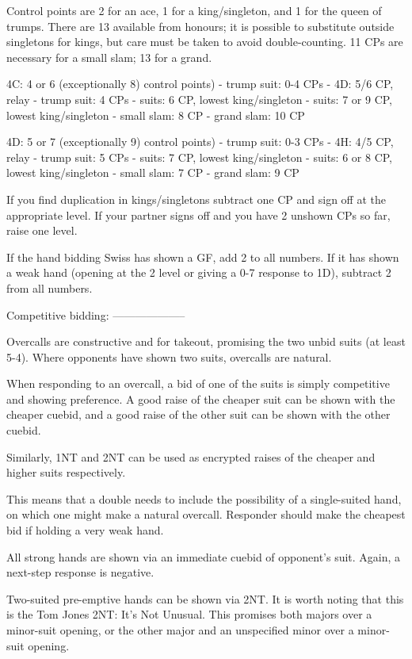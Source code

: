 Control points are 2 for an ace, 1 for a king/singleton, and 1 for the queen of
trumps.  There are 13 available from honours; it is possible to substitute
outside singletons for kings, but care must be taken to avoid double-counting.
11 CPs are necessary for a small slam; 13 for a grand.

4C: 4 or 6 (exceptionally 8) control points)
   - trump suit: 0-4 CPs
   - 4D: 5/6 CP, relay
      - trump suit: 4 CPs
      - suits: 6 CP, lowest king/singleton
   - suits: 7 or 9 CP, lowest king/singleton
   - small slam: 8 CP
   - grand slam: 10 CP

4D: 5 or 7 (exceptionally 9) control points)
   - trump suit: 0-3 CPs
   - 4H: 4/5 CP, relay
      - trump suit: 5 CPs
      - suits: 7 CP, lowest king/singleton
   - suits: 6 or 8 CP, lowest king/singleton
   - small slam: 7 CP
   - grand slam: 9 CP

If you find duplication in kings/singletons subtract one CP and sign off at the
appropriate level. If your partner signs off and you have 2 unshown CPs so far,
raise one level.

If the hand bidding Swiss has shown a GF, add 2 to all numbers. If it has shown
a weak hand (opening at the 2 level or giving a 0-7 response to 1D), subtract 2
from all numbers.

Competitive bidding:
--------------------

Overcalls are constructive and for takeout, promising the two unbid suits (at least 5-4).
Where opponents have shown two suits, overcalls are natural.

When responding to an overcall, a bid of one of the suits is simply competitive
and showing preference.  A good raise of the cheaper suit can be shown with the
cheaper cuebid, and a good raise of the other suit can be shown with the other
cuebid.  

Similarly, 1NT and 2NT can be used as encrypted raises of the cheaper and
higher suits respectively.


This means that a double needs to include the possibility of a single-suited
hand, on which one might make a natural overcall.  Responder should make the
cheapest bid if holding a very weak hand.

All strong hands are shown via an immediate cuebid of opponent's suit.  Again,
a next-step response is negative.

Two-suited pre-emptive hands can be shown via 2NT.  It is worth noting that
this is the Tom Jones 2NT: It's Not Unusual.  This promises both majors over a
minor-suit opening, or the other major and an unspecified minor over a
minor-suit opening.  

